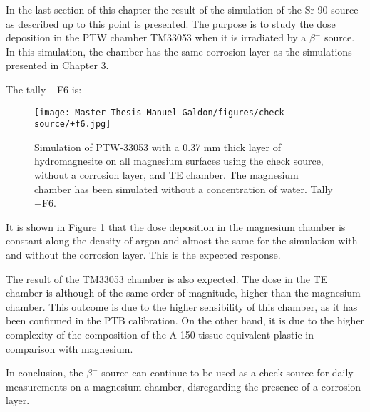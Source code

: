 In the last section of this chapter the result of the simulation of the Sr-90 source as described up to this point is presented. The purpose is to study the dose deposition in the PTW chamber TM33053 when it is irradiated by a $\beta^-$ source. In this simulation, the chamber has the same corrosion layer as the simulations presented in Chapter 3. 

\clearpage
The tally +F6 is:

\begin{figure}[!h]
    \centering
    \texttt{[image: Master Thesis Manuel Galdon/figures/check source/+f6.jpg]}
    \caption{Simulation of PTW-33053 with a 0.37 \unit{\milli\meter} thick layer of hydromagnesite on all magnesium surfaces using the check source, without a corrosion layer, and TE chamber. The magnesium chamber has been simulated without a concentration of water. Tally +F6.}
  \label{fig:PTW-33053 with hydromagnesite. Tally +F6. Electrons}
\end{figure}

It is shown in Figure \ref{fig:PTW-33053 with hydromagnesite. Tally +F6. Electrons} that the dose deposition in the magnesium chamber is constant along the density of argon and almost the same for the simulation with and without the corrosion layer. This is the expected response. %

The result of the TM33053 chamber is also expected. The dose in the TE chamber is although of the same order of magnitude, higher than the magnesium chamber. This outcome is due to the higher sensibility of this chamber, as it has been confirmed in the PTB calibration. On the other hand, it is due to the higher complexity of the composition of the A-150 tissue equivalent plastic in comparison with magnesium. %


In conclusion, the $\beta^-$ source can continue to be used as a check source for daily measurements on a magnesium chamber, disregarding the presence of a corrosion layer.



